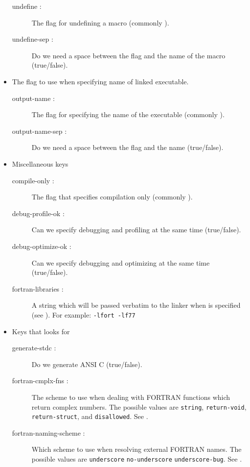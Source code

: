 \begin{itemize}
\begin{description}
\item    [undefine :] The flag for undefining a macro (commonly ).
\item    [undefine-sep :] Do we need a space between the flag and the name of the macro (true/false).
\end{description}

\item The flag to use when specifying name of linked executable.
\begin{description}
\item    [output-name :] The flag for specifying the name of the executable (commonly ).
\item    [output-name-sep :] Do we need a space between the flag and the name (true/false).
\end{description}

\item Miscellaneous keys
\begin{description}
\item    [compile-only :] The flag that specifies compilation only (commonly ).
\item    [debug-profile-ok :] Can we specify debugging and profiling at the same time (true/false).
\item    [debug-optimize-ok :] Can we specify debugging and optimizing at the same time (true/false).
\item    [fortran-libraries :] A string which will be passed verbatim to
the linker  when  is specified (see
).  For example: {\tt -lfort -lf77}
\end{description}

\item Keys that \asharpcmd{} looks for
\begin{description}
\item    [generate-stdc :] Do we generate ANSI C (true/false).
\item    [fortran-cmplx-fns :] The scheme to use when dealing with 
         FORTRAN functions which return complex numbers. 
         The possible values are {\tt string}, {\tt return-void}, 
         {\tt return-struct}, and {\tt disallowed}.
         See .
\item    [fortran-naming-scheme :] Which scheme to use when resolving external FORTRAN names.
         The possible values are {\tt underscore} {\tt no-underscore} {\tt underscore-bug}.
         See .
\end{description}
\end{itemize}

